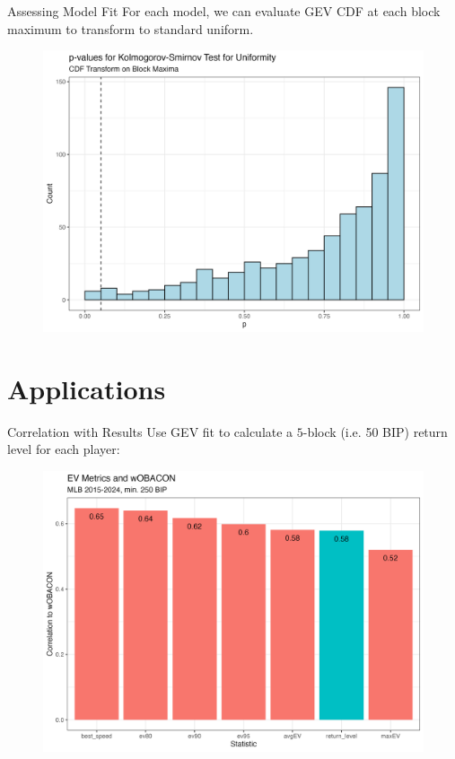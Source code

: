 \documentclass{beamer}
\begin{document}
\begin{frame}{Assessing Model Fit}
    For each model, we can evaluate GEV CDF at each block maximum to transform to standard uniform.
    \begin{figure}
        \centering
        \includegraphics[width=0.85\linewidth]{plots/kstest.png}
    \end{figure}
\end{frame}

\section{Applications}
\begin{frame}{Correlation with Results}
    Use GEV fit to calculate a $5$-block (i.e. 50 BIP) return level for each player:
    \begin{figure}
        \centering
        \includegraphics[width=0.85\linewidth]{plots/woba_correlation.png}
    \end{figure}
\end{frame}
\end{document}

